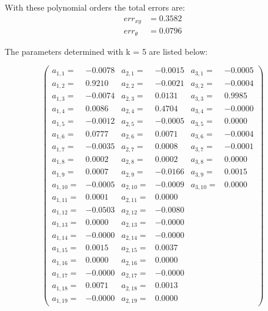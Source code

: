 \documentclass[conference]{IEEEtran}
\begin{document}
\begin{compactenum}[a)]
With these polynomial orders the total errors are:
\begin{align}
	err_{xy} & = 0.3582\\
	err_{\theta} & = 0.0796
\end{align}

The parameters determined with k = 5 are listed below:

$$
\left(
\scriptscriptstyle{
\begin{smallmatrix}
a_{1,1} =&   -0.0078&	a_{2,1} =&   -0.0015&	a_{3,1} =&  -0.0005 \\
a_{1,2} =&    0.9210&	a_{2,2} =&   -0.0021&	a_{3,2} =&	-0.0004	\\
a_{1,3} =&   -0.0074& 	a_{2,3} =&    0.0131&	a_{3,3} =&	 0.9985	\\
a_{1,4} =&    0.0086&	a_{2,4} =&    0.4704&	a_{3,4} =&	-0.0000	\\
a_{1,5} =&   -0.0012&	a_{2,5} =&   -0.0005&	a_{3,5} =&	 0.0000	\\
a_{1,6} =&    0.0777&	a_{2,6} =&    0.0071&	a_{3,6} =&	-0.0004	\\
a_{1,7} =&   -0.0035&	a_{2,7} =&    0.0008&	a_{3,7} =&	-0.0001	\\
a_{1,8} =&    0.0002&	a_{2,8} =&    0.0002&	a_{3,8} =&	 0.0000	\\
a_{1,9} =&    0.0007&	a_{2,9} =&   -0.0166&	a_{3,9} =&	 0.0015	\\
a_{1,10} =&   -0.0005&	a_{2,10} =&   -0.0009&	a_{3,10} =&	 0.0000	\\
a_{1,11} =&    0.0001&	a_{2,11} =&    0.0000	\\
a_{1,12} =&   -0.0503&	a_{2,12} =&   -0.0080	\\
a_{1,13} =&    0.0000&	a_{2,13} =&   -0.0000	\\
a_{1,14} =&   -0.0000&	a_{2,14} =&   -0.0000	\\
a_{1,15} =&    0.0015&	a_{2,15} =&    0.0037	\\
a_{1,16} =&    0.0000&	a_{2,16} =&    0.0000	\\
a_{1,17} =&   -0.0000&	a_{2,17} =&   -0.0000	\\
a_{1,18} =&    0.0071&	a_{2,18} =&    0.0013	\\
a_{1,19} =&   -0.0000&	a_{2,19} =&    0.0000	
\end{smallmatrix}}
\right)
$$



\end{compactenum}
\end{document}
